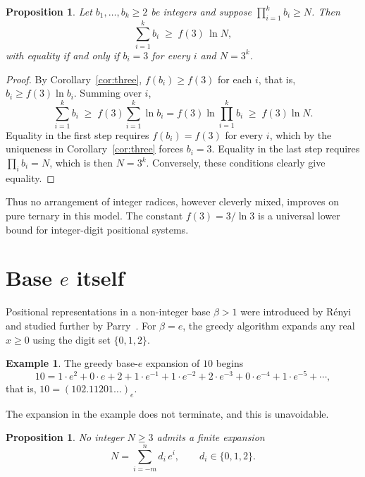 \documentclass[11pt]{amsart}
\newtheorem{proposition}[theorem]{Proposition}
\theoremstyle{definition}
\newtheorem{example}[theorem]{Example}
\theoremstyle{remark}
\numberwithin{equation}{section}
\begin{document}
\begin{proposition}\label{prop:mixed}
Let $b_1,\dots,b_k\ge 2$ be integers and suppose $\prod_{i=1}^k b_i \ge N$.
Then
\[
  \sum_{i=1}^k b_i \;\ge\; f(3)\,\ln N,
\]
with equality if and only if $b_i=3$ for every $i$ and $N=3^k$.
\end{proposition}

\begin{proof}
By Corollary~\ref{cor:three}, $f(b_i)\ge f(3)$ for each $i$, that is,
$b_i \ge f(3)\ln b_i$. Summing over $i$,
\[
  \sum_{i=1}^k b_i \;\ge\; f(3)\sum_{i=1}^k \ln b_i
  = f(3)\ln\prod_{i=1}^k b_i \;\ge\; f(3)\ln N .
\]
Equality in the first step requires $f(b_i)=f(3)$ for every $i$, which by the
uniqueness in Corollary~\ref{cor:three} forces $b_i=3$. Equality in the last
step requires $\prod_i b_i = N$, which is then $N = 3^k$. Conversely, these
conditions clearly give equality.
\end{proof}

Thus no arrangement of integer radices, however cleverly mixed, improves on
pure ternary in this model. The constant $f(3)=3/\ln 3$ is a universal lower
bound for integer-digit positional systems.

\section{\texorpdfstring{Base $e$ itself}{Base e itself}}\label{sec:basee}

Positional representations in a non-integer base $\beta>1$ were introduced by
R\'enyi~\cite{renyi} and studied further by Parry~\cite{parry}. For
$\beta=e$, the greedy algorithm expands any real $x\ge 0$ using the digit
set $\{0,1,2\}$.

\begin{example}
The greedy base-$e$ expansion of $10$ begins
\[
  10 = 1\cdot e^2 + 0\cdot e + 2 + 1\cdot e^{-1} + 1\cdot e^{-2}
       + 2\cdot e^{-3} + 0\cdot e^{-4} + 1\cdot e^{-5} + \cdots,
\]
that is, $10 = (102.11201\ldots)_e$.
\end{example}

The expansion in the example does not terminate, and this is unavoidable.

\begin{proposition}\label{prop:nofinite}
No integer $N\ge 3$ admits a finite expansion
\[
  N = \sum_{i=-m}^{n} d_i\, e^{i}, \qquad d_i\in\{0,1,2\}.
\]
\end{proposition}
\end{document}
